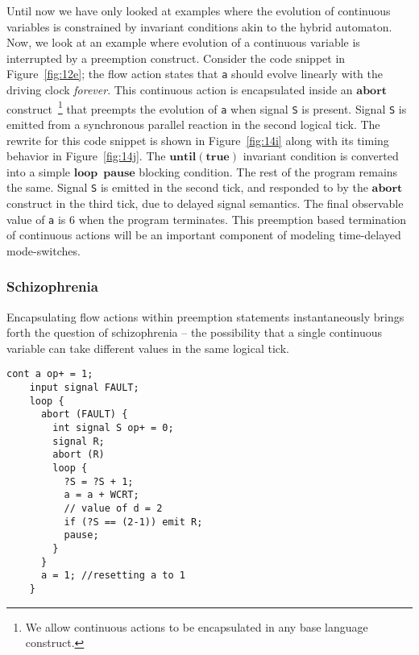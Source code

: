 \documentclass[10pt,journal,cspaper,compsoc]{IEEEtran}
\begin{document}
Until now we have only looked at examples where the evolution of
continuous variables is constrained by invariant conditions akin to the
hybrid automaton. Now, we look at an example where evolution of a
continuous variable is interrupted by a preemption construct. Consider
the code snippet in Figure~\ref{fig:12e}; the flow action states that
\texttt{a} should evolve linearly with the driving clock
\textit{forever}. This continuous action is encapsulated inside an
$\mathbf{abort}$ construct~\footnote{We allow continuous actions to be
  encapsulated in any base language construct.} that preempts the
evolution of \texttt{a} when signal \texttt{S} is present. Signal
\texttt{S} is emitted from a synchronous parallel reaction in the second
logical tick. The rewrite for this code snippet is shown in
Figure~\ref{fig:14i} along with its timing behavior in
Figure~\ref{fig:14j}. The $\mathbf{until(true)}$ invariant condition is
converted into a simple \mbox{$\mathbf{loop}$ $\textbf{pause}$} blocking
condition. The rest of the program remains the same. Signal \texttt{S}
is emitted in the second tick, and responded to by the $\mathbf{abort}$
construct in the third tick, due to delayed signal semantics. The final
observable value of \texttt{a} is 6 when the program terminates. This
preemption based termination of continuous actions will be an important
component of modeling time-delayed mode-switches.

\subsubsection{Schizophrenia}
\label{sec:schizophrenia}

Encapsulating flow actions within preemption statements instantaneously
brings forth the question of schizophrenia -- the possibility that a
single continuous variable can take different values in the same logical
tick.

\newbox{\schtwo}
\begin{lrbox}{\schtwo}
  \begin{lstlisting}[mathescape,style=sysj,morekeywords={until,wait_inbetween,
      cont,signal,loop,abort,await,emit,present,trap,pause,exit,delay,suspend}]
    cont a op+ = 1;
    input signal FAULT;
    loop {
      abort (FAULT) {
        int signal S op+ = 0;
        signal R;
        abort (R) 
        loop {
          ?S = ?S + 1;
          a = a + WCRT;
          // value of d = 2
          if (?S == (2-1)) emit R;
          pause;
        }
      }
      a = 1; //resetting a to 1
    }
  \end{lstlisting}
\end{lrbox}
\end{document}
